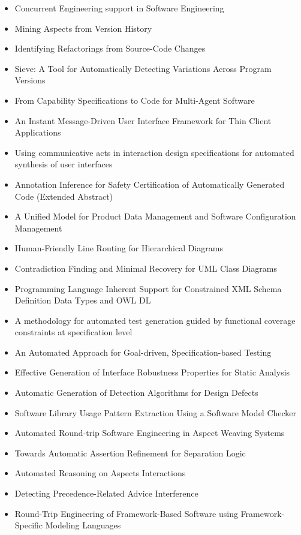 {\begin{itemize}[itemsep=-1ex]
  \item Concurrent Engineering support in Software Engineering
  \item Mining Aspects from Version History
  \item Identifying Refactorings from Source-Code Changes
  \item Sieve: A Tool for Automatically Detecting Variations Across Program Versions
  \item From Capability Specifications to Code for Multi-Agent Software
  \item An Instant Message-Driven User Interface Framework for Thin Client Applications
  \item Using communicative acts in interaction design specifications for automated synthesis of user interfaces
  \item Annotation Inference for Safety Certification of Automatically Generated Code (Extended Abstract)
  \item A Unified Model for Product Data Management and Software Configuration Management
  \item Human-Friendly Line Routing for Hierarchical Diagrams
  \item Contradiction Finding and Minimal Recovery for UML Class Diagrams
  \item Programming Language Inherent Support for Constrained XML Schema Definition Data Types and OWL DL
  \item A methodology for automated test generation guided by functional coverage constraints at specification level
  \item An Automated Approach for Goal-driven, Specification-based Testing
  \item Effective Generation of Interface Robustness Properties for Static Analysis
  \item Automatic Generation of Detection Algorithms for Design Defects
  \item Software Library Usage Pattern Extraction Using a Software Model Checker
  \item Automated Round-trip Software Engineering in Aspect Weaving Systems
  \item Towards Automatic Assertion Refinement for Separation Logic
  \item Automated Reasoning on Aspects Interactions
  \item Detecting Precedence-Related Advice Interference
  \item Round-Trip Engineering of Framework-Based Software using Framework-Specific Modeling Languages

\end{itemize}}
